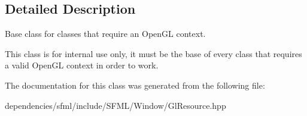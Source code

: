 \subsection{Detailed Description}
Base class for classes that require an Open\+GL context. 

This class is for internal use only, it must be the base of every class that requires a valid Open\+GL context in order to work. 

The documentation for this class was generated from the following file\+:\begin{DoxyCompactItemize}
\item 
dependencies/sfml/include/\+S\+F\+M\+L/\+Window/Gl\+Resource.\+hpp\end{DoxyCompactItemize}
